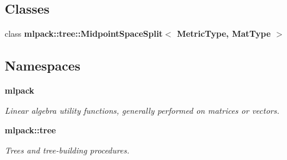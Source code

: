 \subsection*{Classes}
\begin{DoxyCompactItemize}
\item 
class {\bf mlpack\+::tree\+::\+Midpoint\+Space\+Split$<$ Metric\+Type, Mat\+Type $>$}
\end{DoxyCompactItemize}
\subsection*{Namespaces}
\begin{DoxyCompactItemize}
\item 
 {\bf mlpack}
\begin{DoxyCompactList}\small\item\em Linear algebra utility functions, generally performed on matrices or vectors. \end{DoxyCompactList}\item 
 {\bf mlpack\+::tree}
\begin{DoxyCompactList}\small\item\em Trees and tree-\/building procedures. \end{DoxyCompactList}\end{DoxyCompactItemize}

